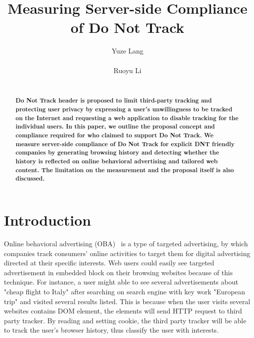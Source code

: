 \documentclass{sig-alternate}
\begin{document}

\title{Measuring Server-side Compliance of Do Not Track}
\author{
\alignauthor
Yuze Lang\\
      \\
\alignauthor
Ruoyu Li\\
      \\
}

\newcommand{\todo}[1]{\textbf{[TODO: #1]}}

\maketitle
\begin{abstract}
\textbf{Do Not Track header is proposed to limit third-party tracking and protecting user privacy by expressing a user's unwillingness to be tracked on the Internet and requesting a web application to disable tracking for the individual users. In this paper, we outline the proposal concept and compliance required for who claimed to support Do Not Track. We measure server-side compliance of Do Not Track for explicit DNT friendly companies by generating browsing history and detecting whether the history is reflected on online behavioral advertising and tailored web content. The limitation on the measurement and the proposal itself is also discussed.}
\end{abstract}



\section{Introduction}\label{sec:intro}
Online behavioral advertising (OBA)~\cite{sheltononline} is a type of targeted advertising, by which companies track consumers’ online activities to target them for digital advertising directed at their specific interests. Web users could easily see targeted advertisement in embedded block on their browsing websites because of this technique. For instance, a user might able to see several advertisements about "cheap flight to Italy" after searching on search engine with key work "European trip" and visited several results listed. This is because when the user visits several websites contains DOM element, the elements will send HTTP request to third party tracker. By reading and setting cookie, the third party tracker will be able to track the user’s browser history, thus classify the user with interests.
\end{document}
